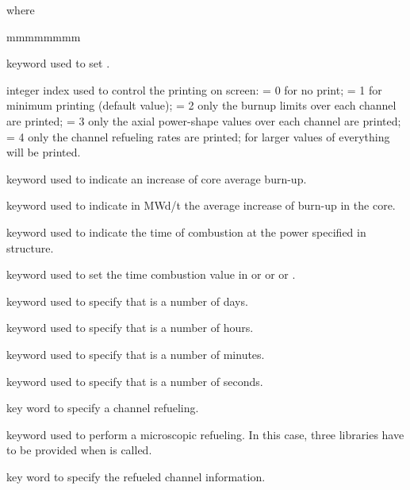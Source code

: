 \noindent where
\begin{ListeDeDescription}{mmmmmmmm}

\item[\moc{EDIT}] keyword used to set .

\item[\dusa{iprint}] integer index used to control the printing on screen:
 = 0 for no print; = 1 for minimum printing (default value); = 2 only the burnup limits
over each channel are printed; = 3 only the axial power-shape values over each channel
are printed; = 4 only the channel refueling rates are printed; for larger values of
 everything will be printed.

\item[\moc{BURN-STEP}] keyword used to indicate an increase of core average burn-up.

\item[\dusa{rburn}] keyword used to indicate in MWd/t the average increase
of burn-up in the core.

\item[\moc{TIME}] keyword used to indicate the time of combustion at the power specified
in  structure.

\item[\dusa{rtime}] keyword used to set the time combustion value in  or 
or  or .

\item[\moc{DAY}] keyword used to specify that  is a number of days.

\item[\moc{HOUR}] keyword used to specify that  is a number of hours.

\item[\moc{MINUTE}] keyword used to specify that  is a number of minutes.

\item[\moc{SECOND}] keyword used to specify that  is a number of seconds.

\item[\moc{REFUEL}] key word to specify a channel refueling.

\item[\moc{MICRO}] keyword used to perform a microscopic refueling. In this case, three libraries have to be provided when  is called.

\item[\moc{CHAN}] key word to specify the refueled channel information.


\end{ListeDeDescription}
